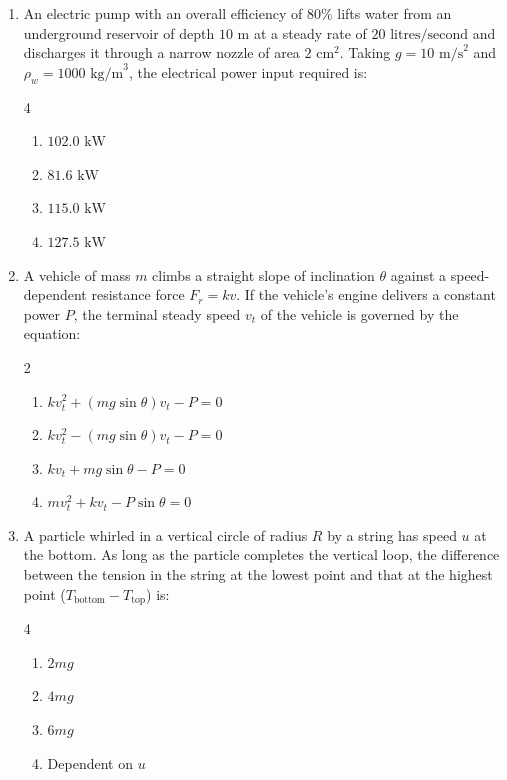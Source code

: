 \documentclass[11pt,a4paper]{article}
\begin{document}
\begin{enumerate}[label=\textbf{\arabic*.},leftmargin=18pt,itemsep=8pt,resume]
  \item An electric pump with an overall efficiency of $80\%$ lifts water from an underground reservoir of depth $10\text{ m}$ at a steady rate of $20\text{ litres/second}$ and discharges it through a narrow nozzle of area $2\text{ cm}^2$. Taking $g = 10\text{ m/s}^2$ and $\rho_w = 1000\text{ kg/m}^3$, the electrical power input required is:
  \begin{multicols}{4}
    \begin{enumerate}[label=(\Alph*)]
      \item $102.0\text{ kW}$
      \item $81.6\text{ kW}$
      \item $115.0\text{ kW}$
      \item $127.5\text{ kW}$
    \end{enumerate}
  \end{multicols}

  \item A vehicle of mass $m$ climbs a straight slope of inclination $\theta$ against a speed-dependent resistance force $F_r = kv$. If the vehicle's engine delivers a constant power $P$, the terminal steady speed $v_t$ of the vehicle is governed by the equation:
  \begin{multicols}{2}
    \begin{enumerate}[label=(\Alph*)]
      \item $k v_t^2 + (mg\sin\theta)v_t - P = 0$
      \item $k v_t^2 - (mg\sin\theta)v_t - P = 0$
      \item $k v_t + mg\sin\theta - P = 0$
      \item $m v_t^2 + k v_t - P\sin\theta = 0$
    \end{enumerate}
  \end{multicols}

  \item A particle whirled in a vertical circle of radius $R$ by a string has speed $u$ at the bottom. As long as the particle completes the vertical loop, the difference between the tension in the string at the lowest point and that at the highest point ($T_{\text{bottom}} - T_{\text{top}}$) is:
  \begin{multicols}{4}
    \begin{enumerate}[label=(\Alph*)]
      \item $2mg$
      \item $4mg$
      \item $6mg$
      \item Dependent on $u$
    \end{enumerate}
  \end{multicols}


\end{enumerate}
\end{document}
